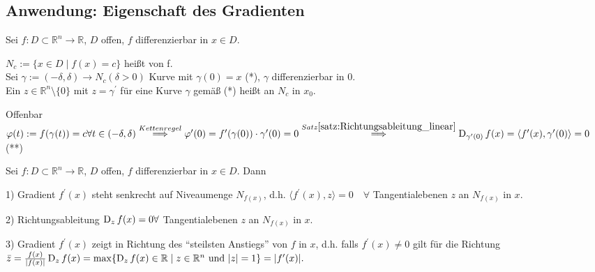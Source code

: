 \subsection{Anwendung: Eigenschaft des Gradienten}

Sei $f: D \subset \mathbb{R}^n \to \mathbb{R}$, $D$ offen, $f$ differenzierbar in $x\in D$.\\

\begin{definition}
    $N_c := \{x \in D \mid f(x) = c\}$  heißt  von f.\\
    Sei $\gamma := (-\delta, \delta) \to N_c(\delta > 0)$ Kurve mit $\gamma(0) = x$ (*), $\gamma$ differenzierbar in $0$.\\
    Ein $z \in \mathbb{R}^n\setminus\{0\}$  mit $z = \gamma^{\prime}$ für eine Kurve $\gamma$ gemäß (*) heißt  an $N_c$ in $x_0$.
\end{definition}

Offenbar $\varphi(t) := f(\gamma(t)) = c \forall t \in (-\delta, \delta)\\ \overset{Kettenregel}{\Longrightarrow} \varphi^{\prime}(0) = f^{\prime}(\gamma(0))\cdot \gamma^{\prime}(0) = 0 \overset{Satz \ref{satz:Richtungsableitung_linear}}{\Longrightarrow} \operatorname{D}_{\gamma^{\prime}(0)}f(x) = \langle f^{\prime}(x),\gamma^{\prime}(0)\rangle =0$ (**)

\begin{satz}\label{satz:egs_grad}
    Sei $f: D \subset \mathbb{R}^n \to \mathbb{R}$, $D$ offen, $f$ differenzierbar in $x \in D$. Dann
    \begin{compactitem}
        \item[1)] Gradient $f^{\prime}(x)$ steht senkrecht auf Niveaumenge $N_{f(x)}$, d.h. $\langle f^{\prime}(x), z\rangle = 0 \quad\forall$ Tangentialebenen $z$ an $N_{f(x)}$ in $x$.
        \item[2)] Richtungsableitung $\operatorname{D}_z f(x) = 0 \forall$ Tangentialebenen $z$ an $N_{f(x)}$ in $x$.
        \item[3)] Gradient $f^{\prime}(x)$ zeigt in Richtung des ``steilsten Anstiegs'' von $f$ in $x$, d.h. falls $f^{\prime}(x) \neq 0$ gilt für die Richtung $\bar{z} = \frac{f(x)}{\vert f(x) \vert} \operatorname{D}_z f(x) = \max\{\operatorname{D}_z f(x) \in \mathbb{R} \mid z \in \mathbb{R}^n \text{ und } \vert z \vert = 1\} = \vert f^{\prime}(x)\vert.$
    \end{compactitem}
\end{satz}

